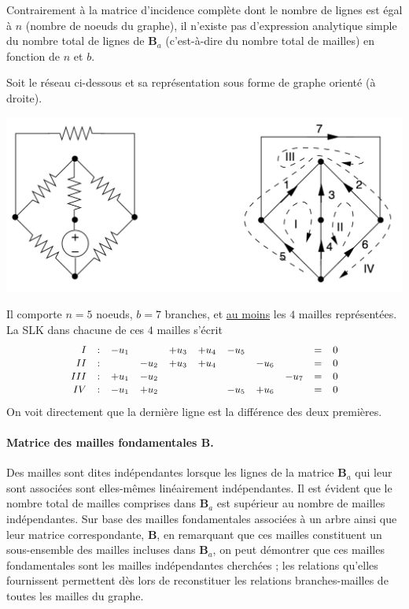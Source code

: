 Contrairement à la matrice d'incidence complète dont le nombre de lignes est égal
à $n$ (nombre de noeuds du graphe), il n'existe pas d'expression analytique simple du nombre total de lignes de $\mathbf{B}_a$ (c'est-à-dire du nombre total de mailles) en fonction de $n$ et $b$.

\begin{testexample}
	Soit le réseau ci-dessous et sa représentation sous forme de graphe orienté (à droite).
	\begin{center}
		\centering
		\includegraphics[width=0.9\linewidth]{figs/methodes-generales/m_mailles_1}
	\end{center}
	Il comporte $n=5$ noeuds, $b=7$ branches, et \underline{au moins} les $4$ mailles représentées. La SLK dans chacune de ces $4$ mailles s'écrit
	$$
	{\small
		\begin{array}{rcccccccccl}
		I & :&  - u_1&     & + u_3  & +  u_4  & -  u_5 &    &    & = &
		0\\ 
		II & : &     & -u_2&+ u_3& +  u_4  &        &-  u_6  &        &
		= & 0\\
		III & : &  + u_1  &-  u_2&     &     &     &  & -  u_7 & = &
		0 \\
		IV & : & -  u_1  &+   u_2  &   &  & -    u_5   &+  u_6  &   
		& = & 0
		\end{array}}
	$$
	On voit directement que la dernière ligne est la différence des deux premières.
\end{testexample}


\paragraph{Matrice des mailles fondamentales $\mathbf{B}$.}

Des mailles sont dites indépendantes lorsque les lignes de la matrice $\mathbf{B}_a$ qui leur sont associées sont elles-mêmes linéairement indépendantes. Il est évident que le nombre total de mailles comprises dans $\mathbf{B}_a$ est supérieur au nombre de mailles indépendantes.
Sur base des mailles fondamentales associées à un arbre ainsi que leur matrice correspondante, $\mathbf{B}$, en remarquant que ces mailles constituent un sous-ensemble des mailles incluses dans $\mathbf{B}_a$, on peut 
démontrer que ces mailles fondamentales sont les mailles indépendantes cherchées ;
les relations qu'elles fournissent permettent dès lors de reconstituer les relations branches-mailles de toutes les mailles du graphe.


